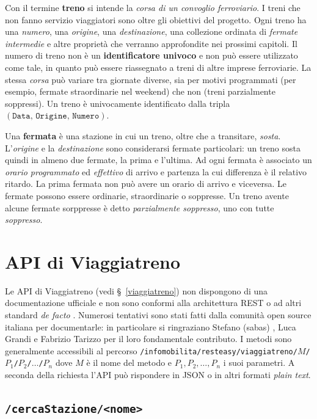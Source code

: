 \documentclass[12pt,italian]{report}
\begin{document}
Con il termine \textbf{treno} si intende la \textit{corsa di un
    convoglio ferroviario}.  I treni che non fanno servizio
viaggiatori sono oltre gli obiettivi del progetto.  Ogni treno ha una
\textit{numero}, una \textit{origine}, una \textit{destinazione}, una
collezione ordinata di \textit{fermate intermedie} e altre proprietà
che verranno approfondite nei prossimi capitoli.  Il numero di treno
non è un \textbf{identificatore univoco} e non può essere utilizzato
come tale, in quanto può essere riassegnato a treni di altre imprese
ferroviarie.  La stessa \textit{corsa} può variare tra giornate
diverse, sia per motivi programmati (per esempio, fermate
straordinarie nel weekend) che non (treni parzialmente soppressi).  Un
treno è univocamente identificato dalla tripla
$(\texttt{Data}, \, \texttt{Origine}, \, \texttt{Numero})$.

Una \textbf{fermata} è una stazione in cui un treno, oltre che a
transitare, \textit{sosta}.  L'\textit{origine} e la
\textit{destinazione} sono considerarsi fermate particolari: un treno
sosta quindi in almeno due fermate, la prima e l'ultima.  Ad ogni
fermata è associato un \textit{orario programmato} ed
\textit{effettivo} di arrivo e partenza la cui differenza è il
relativo ritardo.  La prima fermata non può avere un orario di arrivo
e viceversa.  Le fermate possono essere ordinarie, straordinarie o
soppresse.  Un treno avente alcune fermate sorppresse è detto
\textit{parzialmente soppresso}, uno con tutte \textit{soppresso}.

\section{API di Viaggiatreno}

Le API di Viaggiatreno (vedi \S~\ref{viaggiatreno}) non dispongono di
una documentazione ufficiale e non sono conformi alla architettura
REST o ad altri standard \textit{de facto} \cite{Giunta}.  Numerosi
tentativi sono stati fatti dalla comunità open source italiana per
documentarle: in particolare si ringraziano Stefano (sabas)
\cite{Sabas}, Luca Grandi \cite{Grandi} e Fabrizio Tarizzo
\cite{Tarizzo} per il loro fondamentale contributo.  I metodi sono
generalmente accessibili al percorso
\texttt{/infomobilita/\-resteasy/\-viaggiatreno/\-$M$/\-$P_1$/\-$P_2$/\-$\dots$/\-$P_n$}
dove $M$ è il nome del metodo e $P_1, P_2, \dots, P_n$ i suoi
parametri. A seconda della richiesta l'API può rispondere in JSON o in
altri formati \textit{plain text}.


\subsection{\texttt{/cercaStazione/<nome>}}
\label{cercaStazione}
\end{document}
